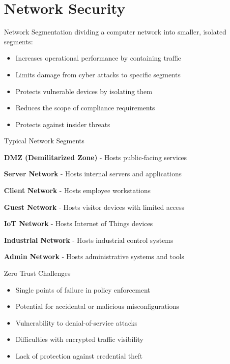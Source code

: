 \section{Network Security}


\begin{definition}{Network Segmentation}
dividing a computer network into smaller, isolated segments:
\begin{itemize}
    \item Increases operational performance by containing traffic
    \item Limits damage from cyber attacks to specific segments
    \item Protects vulnerable devices by isolating them
    \item Reduces the scope of compliance requirements
    \item Protects against insider threats
\end{itemize}
\end{definition}

\begin{concept}{Typical Network Segments}

    \textbf{DMZ (Demilitarized Zone)} - Hosts public-facing services

    \textbf{Server Network} - Hosts internal servers and applications

    \textbf{Client Network} - Hosts employee workstations

    \textbf{Guest Network} - Hosts visitor devices with limited access

    \textbf{IoT Network} - Hosts Internet of Things devices

    \textbf{Industrial Network} - Hosts industrial control systems

    \textbf{Admin Network} - Hosts administrative systems and tools

\end{concept}

\begin{theorem}{Zero Trust Challenges}
\begin{itemize}
    \item Single points of failure in policy enforcement
    \item Potential for accidental or malicious misconfigurations
    \item Vulnerability to denial-of-service attacks
    \item Difficulties with encrypted traffic visibility
    \item Lack of protection against credential theft
\end{itemize}
\end{theorem}


